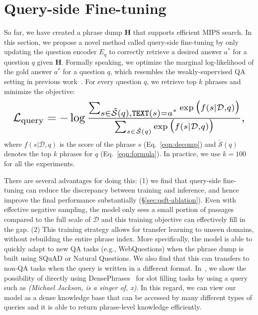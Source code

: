 \documentclass[11pt,a4paper]{article}
\newcommand{\ours}{DensePhrases}
\newcommand{\documentset}{\mathcal{D}}
\newcommand{\phrasedump}{\mf{H}}
\newcommand\ti[1]{\textit{#1}}
\newcommand\ttt[1]{\texttt{#1}}
\newcommand\mf[1]{\mathbf{#1}}
\begin{document}
\section{Query-side Fine-tuning}
\label{sec:qsft}
So far, we have created a phrase dump $\phrasedump$ that supports efficient MIPS search. In this section, we propose a novel method called {query-side fine-tuning} by only updating the question encoder $E_q$ to correctly retrieve a desired answer $a^*$ for a question $q$ given $\phrasedump$.
Formally speaking, we optimize the marginal log-likelihood of the gold answer $a^*$ for a question $q$, which resembles the weakly-supervised QA setting in previous work~\citep{lee2019latent,min2019discrete}.
For every question $q$, we retrieve top $k$ phrases and minimize the objective:
\begin{equation}\label{eqn:qsft}
\resizebox{1.0\columnwidth}{!}{
    $\mathcal{L}_\text{query} = -\log \frac{\sum_{\substack{s \in \tilde{\mathcal{S}}(q), {\ttt{TEXT}(s) = a^*}}} \exp{\big(f(s|\documentset, q)\big)}}{\sum_{s \in \tilde{\mathcal{S}}(q)} \exp{\big(f(s|\documentset, q)\big)}},$
}
\end{equation}
where $f(s|\documentset, q)$ is the score of the phrase $s$ (Eq.~\eqref{eqn:decomp}) and $\tilde{\mathcal{S}}(q)$ denotes the top $k$ phrases for $q$ (Eq.~\eqref{eqn:formula}).
In practice, we use $k=100$ for all the experiments.


There are several advantages for doing this: (1) we find that query-side fine-tuning can reduce the discrepancy between training and inference, and hence improve the final performance substantially (\S\ref{sec:qsft-ablation}). Even with effective negative sampling, the model only sees a small portion of passages compared to the full scale of $\documentset$ and this training objective can effectively fill in the gap. (2) This training strategy allows for transfer learning to unseen domains, without rebuilding the entire phrase index. More specifically, the model is able to quickly adapt to new QA tasks (e.g., WebQuestions) when the phrase dump is built using SQuAD or Natural Questions. We also find that this can transfers to non-QA tasks when the query is written in a different format.
In~, we show the possibility of directly using \ours~ for slot filling tasks by using a query such as \ti{(Michael Jackson, is a singer of, x)}. In this regard, we can view our model as a dense knowledge base that can be accessed by many different types of queries and it is able to return phrase-level knowledge efficiently.
\end{document}
